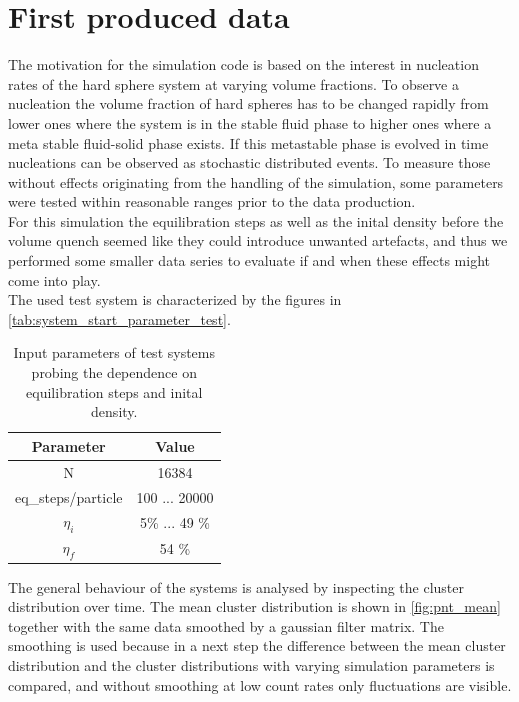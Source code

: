 \section{First produced data}
\label{sec:data}
The motivation for the simulation code is based on the interest in nucleation rates of the hard sphere system at varying volume fractions. To observe a nucleation the volume fraction of hard spheres has to be changed rapidly from lower ones where the system is in the stable fluid phase to higher ones where a meta stable fluid-solid phase exists. If this metastable phase is evolved in time nucleations can be observed as stochastic distributed events. To measure those without effects originating from the handling of the simulation, some parameters were tested within reasonable ranges prior to the data production.\\
For this simulation the equilibration steps as well as the inital density before the volume quench seemed like they could introduce unwanted artefacts, and thus we performed some smaller data series to evaluate if and when these effects might come into play.\\

The used test system is characterized by the figures in \autoref{tab:system_start_parameter_test}.

\begin{table}
\centering
\begin{tabular}{c|c}
Parameter & Value \\ \hline
N & 16384 \\
eq\_steps/particle & 100 ... 20000 \\
$\eta_i$ & 5\% ... 49 \% \\
$\eta_f$ & 54 \% \\
\end{tabular}
\caption{Input parameters of test systems probing the dependence on equilibration steps and inital density.}
\label{tab:system_start_parameter_test}
\end{table}

The general behaviour of the systems is analysed by inspecting the cluster distribution over time. The mean cluster distribution is shown in \autoref{fig:pnt_mean} together with the same data smoothed by a gaussian filter matrix. The smoothing is used because in a next step the difference between the mean cluster distribution and the cluster distributions with varying simulation parameters is compared, and without smoothing at low count rates only fluctuations are visible.\\


